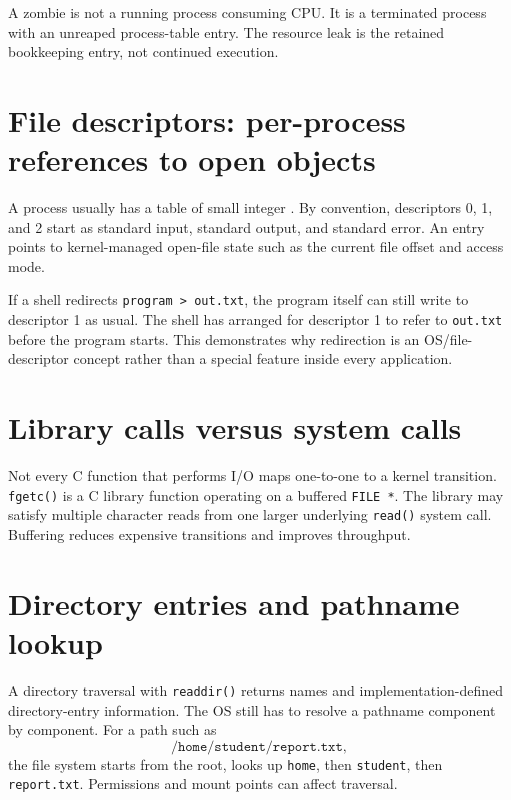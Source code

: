\begin{pitfall}
A zombie is not a running process consuming CPU. It is a terminated process with an unreaped process-table entry. The resource leak is the retained bookkeeping entry, not continued execution.
\end{pitfall}

\section{File descriptors: per-process references to open objects}
A process usually has a table of small integer . By convention, descriptors 0, 1, and 2 start as standard input, standard output, and standard error. An entry points to kernel-managed open-file state such as the current file offset and access mode.

\begin{workedexample}
If a shell redirects \texttt{program > out.txt}, the program itself can still write to descriptor 1 as usual. The shell has arranged for descriptor 1 to refer to \texttt{out.txt} before the program starts. This demonstrates why redirection is an OS/file-descriptor concept rather than a special feature inside every application.
\end{workedexample}

\section{Library calls versus system calls}
Not every C function that performs I/O maps one-to-one to a kernel transition. \texttt{fgetc()} is a C library function operating on a buffered \texttt{FILE *}. The library may satisfy multiple character reads from one larger underlying \texttt{read()} system call. Buffering reduces expensive transitions and improves throughput.

\section{Directory entries and pathname lookup}
A directory traversal with \texttt{readdir()} returns names and implementation-defined directory-entry information. The OS still has to resolve a pathname component by component. For a path such as
\[
\texttt{/home/student/report.txt},
\]
the file system starts from the root, looks up \texttt{home}, then \texttt{student}, then \texttt{report.txt}. Permissions and mount points can affect traversal.

